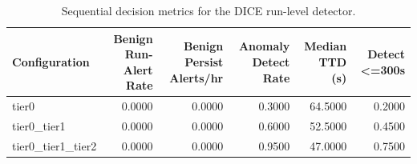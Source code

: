 \begin{table}[t]
\centering
\caption{Sequential decision metrics for the DICE run-level detector.}
\label{tab:dice_sequential_metrics}
\footnotesize
\begin{tabular}{lrrrrr}
\toprule
Configuration & Benign Run-Alert Rate & Benign Persist Alerts/hr & Anomaly Detect Rate & Median TTD (s) & Detect <=300s \\
\midrule
tier0 & 0.0000 & 0.0000 & 0.3000 & 64.5000 & 0.2000 \\
tier0_tier1 & 0.0000 & 0.0000 & 0.6000 & 52.5000 & 0.4500 \\
tier0_tier1_tier2 & 0.0000 & 0.0000 & 0.9500 & 47.0000 & 0.7500 \\
\bottomrule
\end{tabular}

\end{table}
